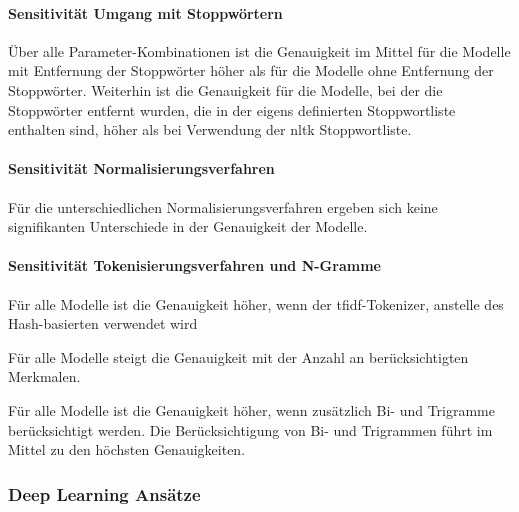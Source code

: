 \paragraph{Sensitivität Umgang mit Stoppwörtern}

Über alle Parameter-Kombinationen ist die Genauigkeit im Mittel für die Modelle mit Entfernung der Stoppwörter höher als für die Modelle ohne Entfernung der Stoppwörter.
Weiterhin ist die Genauigkeit für die Modelle, bei der die Stoppwörter entfernt wurden, die in der eigens definierten Stoppwortliste enthalten sind, höher als bei Verwendung der \gls{nltk} Stoppwortliste.

\paragraph{Sensitivität Normalisierungsverfahren}

Für die unterschiedlichen Normalisierungsverfahren ergeben sich keine signifikanten Unterschiede in der Genauigkeit der Modelle.

\paragraph{Sensitivität Tokenisierungsverfahren und N-Gramme}

Für alle Modelle ist die Genauigkeit höher, wenn der \gls{tfidf}-Tokenizer, anstelle des Hash-basierten verwendet wird

Für alle Modelle steigt die Genauigkeit mit der Anzahl an berücksichtigten Merkmalen.

Für alle Modelle ist die Genauigkeit höher, wenn zusätzlich Bi- und Trigramme berücksichtigt werden.
Die Berücksichtigung von Bi- und Trigrammen führt im Mittel zu den höchsten Genauigkeiten.

\subsubsection{Deep Learning Ansätze}

